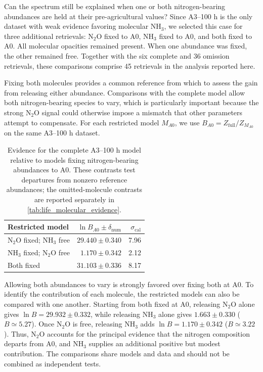 Can the spectrum still be explained when one or both nitrogen-bearing abundances are held at their pre-agricultural values? Since A3--100 h is the only dataset with weak evidence favoring molecular $\mathrm{NH_3}$, we selected this case for three additional retrievals: $\mathrm{N_2O}$ fixed to A0, $\mathrm{NH_3}$ fixed to A0, and both fixed to A0. All molecular opacities remained present. When one abundance was fixed, the other remained free. Together with the six complete and 36 omission retrievals, these comparisons comprise 45 retrievals in the analysis reported here.

Fixing both molecules provides a common reference from which to assess the gain from releasing either abundance. Comparisons with the complete model allow both nitrogen-bearing species to vary, which is particularly important because the strong $\mathrm{N_2O}$ signal could otherwise impose a mismatch that other parameters attempt to compensate. For each restricted model $M_{A0}$, we use $B_{A0}=Z_{\mathrm{full}}/Z_{M_{A0}}$ on the same A3--100 h dataset.

\begin{table}[t!]
\centering
\caption{Evidence for the complete A3--100 h model relative to models fixing nitrogen-bearing abundances to A0. These contrasts test departures from nonzero reference abundances; the omitted-molecule contrasts are reported separately in \autoref{tab:life_molecular_evidence}.}
\label{tab:life_a0_constraints}
\begin{tabular}{lrr}
\hline
Restricted model & $\ln B_{A0}\pm\delta_{\mathrm{num}}$ & $\sigma_{\mathrm{cal}}$ \\
\hline
$\mathrm{N_2O}$ fixed; $\mathrm{NH_3}$ free & $29.440\pm0.340$ & 7.96 \\
$\mathrm{NH_3}$ fixed; $\mathrm{N_2O}$ free & $1.170\pm0.342$ & 2.12 \\
Both fixed & $31.103\pm0.336$ & 8.17 \\
\hline
\end{tabular}
\end{table}

Allowing both abundances to vary is strongly favored over fixing both at A0. To identify the contribution of each molecule, the restricted models can also be compared with one another. Starting from both fixed at A0, releasing $\mathrm{N_2O}$ alone gives $\ln B=29.932\pm0.332$, while releasing $\mathrm{NH_3}$ alone gives $1.663\pm0.330$ ($B\simeq5.27$). Once $\mathrm{N_2O}$ is free, releasing $\mathrm{NH_3}$ adds $\ln B=1.170\pm0.342$ ($B\simeq3.22$). Thus, $\mathrm{N_2O}$ accounts for the principal evidence that the nitrogen composition departs from A0, and $\mathrm{NH_3}$ supplies an additional positive but modest contribution. The comparisons share models and data and should not be combined as independent tests.

